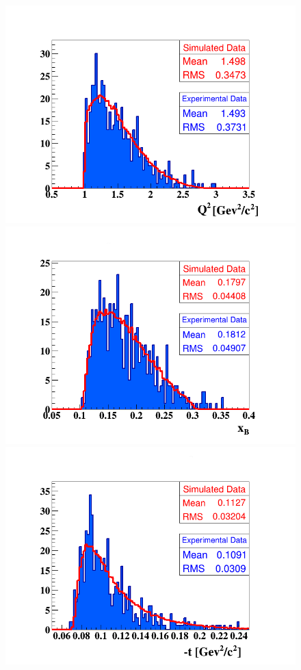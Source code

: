\begin{figure}[h!]
\hspace{-0.1in}\includegraphics[scale=0.37]{fig_dvcs/comp/Q2_Coh_pi0.png}
\hspace{-0.4in}\includegraphics[scale=0.37]{fig_dvcs/comp/xB_Coh_pi0.png}
\hspace*{-0.1in}\includegraphics[scale=0.37]{fig_dvcs/comp/t_Coh_pi0.png}

\end{figure}
